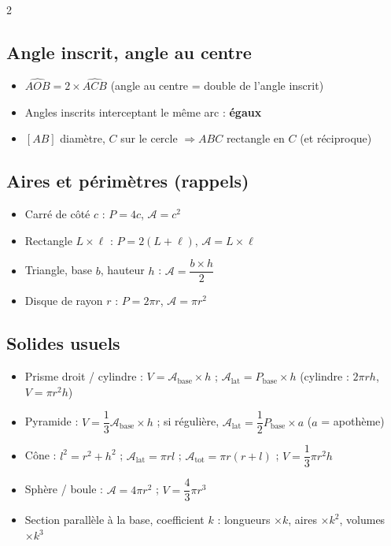 \begin{multicols}{2}
\subsection*{\color{onbo}Angle inscrit, angle au centre}
\begin{itemize}
\item $\widehat{AOB}=2\times\widehat{ACB}$ (angle au centre = double de l'angle inscrit)
\item Angles inscrits interceptant le même arc : \textbf{égaux}
\item $[AB]$ diamètre, $C$ sur le cercle $\Rightarrow ABC$ rectangle en $C$ (et réciproque)
\end{itemize}

\subsection*{\color{onbo}Aires et périmètres (rappels)}
\begin{itemize}
\item Carré de côté $c$ : $P=4c$, $\mathcal A=c^{2}$
\item Rectangle $L\times\ell$ : $P=2(L+\ell)$, $\mathcal A=L\times\ell$
\item Triangle, base $b$, hauteur $h$ : $\mathcal A=\dfrac{b\times h}2$
\item Disque de rayon $r$ : $P=2\pi r$, $\mathcal A=\pi r^{2}$
\end{itemize}

\subsection*{\color{onbo}Solides usuels}
\begin{itemize}
\item Prisme droit / cylindre : $V=\mathcal A_{\text{base}}\times h$ ;
$\mathcal A_{\text{lat}}=P_{\text{base}}\times h$ (cylindre : $2\pi rh$, $V=\pi r^{2}h$)
\item Pyramide : $V=\dfrac13\mathcal A_{\text{base}}\times h$ ; si régulière,
$\mathcal A_{\text{lat}}=\dfrac12P_{\text{base}}\times a$ ($a$ = apothème)
\item Cône : $l^{2}=r^{2}+h^{2}$ ; $\mathcal A_{\text{lat}}=\pi rl$ ;
$\mathcal A_{\text{tot}}=\pi r(r+l)$ ; $V=\dfrac13\pi r^{2}h$
\item Sphère / boule : $\mathcal A=4\pi r^{2}$ ; $V=\dfrac43\pi r^{3}$
\item Section parallèle à la base, coefficient $k$ : longueurs $\times k$, aires
$\times k^{2}$, volumes $\times k^{3}$
\end{itemize}


\end{multicols}
